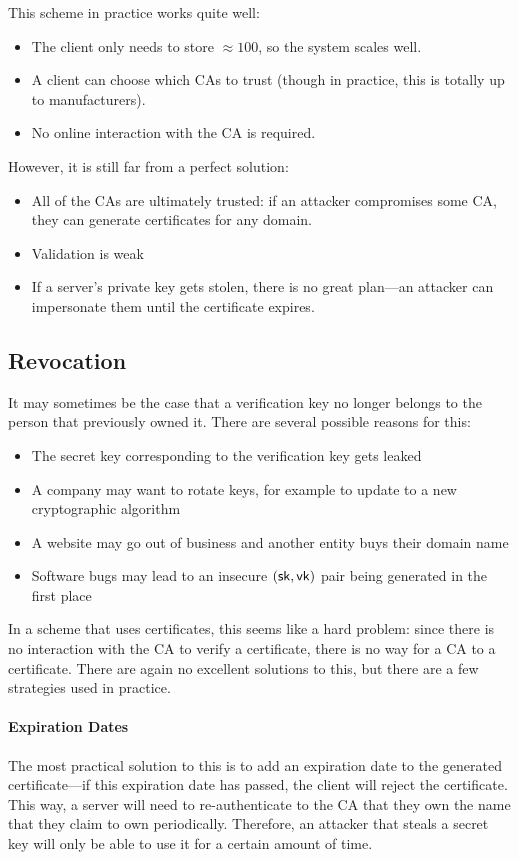 This scheme in practice works quite well:
\begin{itemize}[noitemsep]
	\item The client only needs to store $\approx 100$, so the system scales well.
	\item A client can choose which CAs to trust (though in practice, this is totally up to manufacturers).
	\item No online interaction with the CA is required.
\end{itemize}

However, it is still far from a perfect solution:
\begin{itemize}[noitemsep]
	\item All of the CAs are ultimately trusted: if an attacker compromises some CA, they can generate certificates for any domain.
	\item Validation is weak
	\item If a server's private key gets stolen, there is no great plan---an attacker can impersonate them until the certificate expires.
\end{itemize}

\subsection{Revocation}
It may sometimes be the case that a verification key no longer belongs to the person that previously owned it. There are several possible reasons for this:
\begin{itemize}[noitemsep]
	\item The secret key corresponding to the verification key gets leaked
	\item A company may want to rotate keys, for example to update to a new cryptographic algorithm
	\item A website may go out of business and another entity buys their domain name
	\item Software bugs may lead to an insecure $({\mathsf{sk}}, \mathsf{vk})$ pair being generated in the first place
\end{itemize}

In a scheme that uses certificates, this seems like a hard problem: since there is no interaction with the CA to verify a certificate, there is no way for a CA to  a certificate. There are again no excellent solutions to this, but there are a few strategies used in practice.

\paragraph{Expiration Dates}
The most practical solution to this is to add an expiration date to the generated certificate---if this expiration date has passed, the client will reject the certificate. This way, a server will need to re-authenticate to the CA that they own the name that they claim to own periodically. Therefore, an attacker that steals a secret key will only be able to use it for a certain amount of time.

